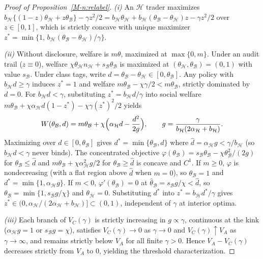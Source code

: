 \documentclass[12pt]{article}
\theoremstyle{definition}
\theoremstyle{remark}
\begin{document}
\begin{proof}[Proof of Proposition~\ref{M-n:relabel}]
\emph{(i)} An $\mathcal{H}$ trader maximizes $b_{\mathcal{H}}\{(1 - z)\theta_{\mathcal{H}} + z \theta_{\mathcal{B}}\} - \gamma z^2/2 = b_{\mathcal{H}}\theta_{\mathcal{H}} + b_{\mathcal{H}}(\theta_{\mathcal{B}} - \theta_{\mathcal{H}})z - \gamma z^2/2$ over $z \in [0, 1]$, which is strictly concave with unique maximizer $z^* = \min\{1,\, b_{\mathcal{H}}(\theta_{\mathcal{B}} - \theta_{\mathcal{H}})/\gamma\}$.

\emph{(ii)} Without disclosure, welfare is $m\theta$, maximized at $\max\{0, m\}$. Under an audit trail ($z \equiv 0$), welfare $\chi \theta_{\mathcal{H}} n_{\mathcal{H}} + s_{\mathcal{B}} \theta_{\mathcal{B}}$ is maximized at $(\theta_{\mathcal{H}}, \theta_{\mathcal{B}}) = (0, 1)$ with value $s_{\mathcal{B}}$. Under class tags, write $d = \theta_{\mathcal{B}} - \theta_{\mathcal{H}} \in [0, \theta_{\mathcal{B}}]$. Any policy with $b_{\mathcal{H}} d \ge \gamma$ induces $z^* = 1$ and welfare $m\theta_{\mathcal{B}} - \chi\gamma/2 < m\theta_{\mathcal{B}}$, strictly dominated by $d = 0$. For $b_{\mathcal{H}} d < \gamma$, substituting $z^* = b_{\mathcal{H}} d / \gamma$ into social welfare $m\theta_{\mathcal{B}} + \chi \alpha_{\mathcal{H}} d (1 - z^*) - \chi \gamma (z^*)^2 / 2$ yields
\[
  W(\theta_{\mathcal{B}}, d) = m\theta_{\mathcal{B}} + \chi \Bigl(\alpha_{\mathcal{H}} d - \frac{d^2}{2g}\Bigr),
  \qquad g = \frac{\gamma}{b_{\mathcal{H}}(2\alpha_{\mathcal{H}} + b_{\mathcal{H}})}.
\]
Maximizing over $d \in [0, \theta_{\mathcal{B}}]$ gives $d^* = \min\{\theta_{\mathcal{B}}, \hat{d}\}$ where $\hat{d} = \alpha_{\mathcal{H}} g < \gamma / b_{\mathcal{H}}$ (so $b_{\mathcal{H}} d < \gamma$ never binds). The concentrated objective $\varphi(\theta_{\mathcal{B}}) = s_{\mathcal{B}}\theta_{\mathcal{B}} - \chi \theta_{\mathcal{B}}^2 / (2g)$ for $\theta_{\mathcal{B}} \le \hat{d}$ and $m\theta_{\mathcal{B}} + \chi \alpha_{\mathcal{H}}^2 g / 2$ for $\theta_{\mathcal{B}} \ge \hat{d}$ is concave and $C^1$. If $m \ge 0$, $\varphi$ is nondecreasing (with a flat region above $\hat d$ when $m=0$), so $\theta_{\mathcal{B}} = 1$ and $d^* = \min\{1, \alpha_{\mathcal{H}} g\}$. If $m < 0$, $\varphi'(\theta_{\mathcal{B}}) = 0$ at $\hat{\theta}_{\mathcal{B}} = s_{\mathcal{B}} g / \chi < \hat{d}$, so $\theta_{\mathcal{B}} = \min\{1, s_{\mathcal{B}} g / \chi\}$ and $\theta_{\mathcal{H}} = 0$. Substituting $d^*$ into $z^* = b_{\mathcal{H}} d^* / \gamma$ gives $z^* \in (0, \alpha_{\mathcal{H}}/(2\alpha_{\mathcal{H}} + b_{\mathcal{H}})] \subset (0, 1)$, independent of $\gamma$ at interior optima.

\emph{(iii)} Each branch of $V_C(\gamma)$ is strictly increasing in $g \propto \gamma$, continuous at the kink ($\alpha_{\mathcal{H}} g = 1$ or $s_{\mathcal{B}} g = \chi$), satisfies $V_C(\gamma) \to 0$ as $\gamma \to 0$ and $V_C(\gamma) \uparrow V_A$ as $\gamma \to \infty$, and remains strictly below $V_A$ for all finite $\gamma > 0$. Hence $V_A - V_C(\gamma)$ decreases strictly from $V_A$ to $0$, yielding the threshold characterization.
\end{proof}
\end{document}
